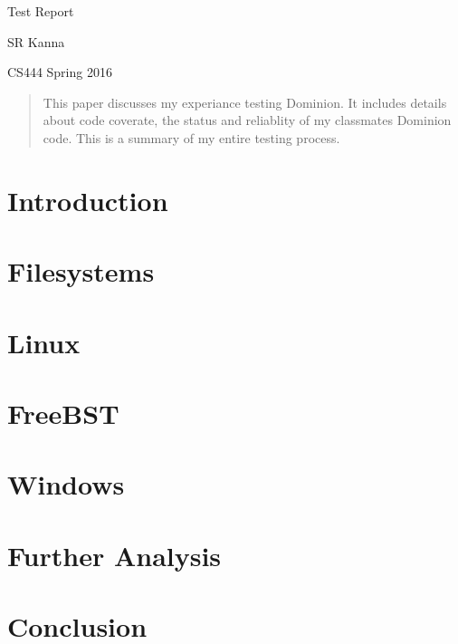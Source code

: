 \documentclass[titlepage]{article}
\begin{document}
\begin{titlepage}
\centering
{\Huge Test Report\par}
{\LARGE SR Kanna\par}
{\Large CS444 Spring 2016\par}

\begin{abstract}
This paper discusses my experiance testing Dominion. It includes details about code coverate, the status and reliablity of my classmates Dominion code. This is a summary of my entire testing process.

\end{abstract}

\end{titlepage}

\section{Introduction}
\begin{singlespace}
\end{singlespace}

\section{Filesystems}
\begin{singlespace}
\end{singlespace}

\section{Linux}
\begin{singlespace}
\end{singlespace}


\begin{singlespace}
\end{singlespace}


\section{FreeBST} 
\begin{singlespace}
\end{singlespace}

\begin{singlespace}
\end{singlespace}

\section{Windows}
\begin{singlespace}
\end{singlespace}

\section{Further Analysis}
\begin{singlespace}

\end{singlespace}

\section{Conclusion}
\begin{singlespace}
\end{singlespace}


\newpage
\end{document}
